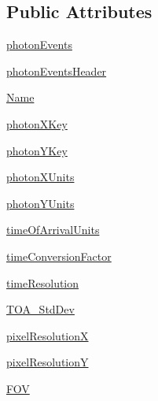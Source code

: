 \subsection*{Public Attributes}
\begin{DoxyCompactItemize}
\item 
\hyperlink{classmodest_1_1spacecraft_1_1chandra_1_1ChandraDetector_ac7c43945033c49fd9019269d724bf173}{photon\+Events}
\item 
\hyperlink{classmodest_1_1spacecraft_1_1chandra_1_1ChandraDetector_aec4bcd6338c7314387b5b7be08117d4b}{photon\+Events\+Header}
\item 
\hyperlink{classmodest_1_1spacecraft_1_1chandra_1_1ChandraDetector_aace6412cc4c3b98b8c127364f434b196}{Name}
\item 
\hyperlink{classmodest_1_1spacecraft_1_1chandra_1_1ChandraDetector_a9368465ea944d450b607cd256c9ca265}{photon\+X\+Key}
\item 
\hyperlink{classmodest_1_1spacecraft_1_1chandra_1_1ChandraDetector_af59eb340da4b61a41631801d2510246b}{photon\+Y\+Key}
\item 
\hyperlink{classmodest_1_1spacecraft_1_1chandra_1_1ChandraDetector_a95236fdcc4372f2a3af51536b1be6ece}{photon\+X\+Units}
\item 
\hyperlink{classmodest_1_1spacecraft_1_1chandra_1_1ChandraDetector_ad2929fae20dc04bef67749c4890a8dce}{photon\+Y\+Units}
\item 
\hyperlink{classmodest_1_1spacecraft_1_1chandra_1_1ChandraDetector_ab78cc698e928c6ff3ab182fc3f241990}{time\+Of\+Arrival\+Units}
\item 
\hyperlink{classmodest_1_1spacecraft_1_1chandra_1_1ChandraDetector_a5301d26739b9fd619f0d82a13ad24880}{time\+Conversion\+Factor}
\item 
\hyperlink{classmodest_1_1spacecraft_1_1chandra_1_1ChandraDetector_a1a8e3064bd35d00d792fe476a972233f}{time\+Resolution}
\item 
\hyperlink{classmodest_1_1spacecraft_1_1chandra_1_1ChandraDetector_a5bc5ab1fcbd46cd16b152aa3820de840}{T\+O\+A\+\_\+\+Std\+Dev}
\item 
\hyperlink{classmodest_1_1spacecraft_1_1chandra_1_1ChandraDetector_a04cbb28585d94cebebbbb3fea44dc366}{pixel\+ResolutionX}
\item 
\hyperlink{classmodest_1_1spacecraft_1_1chandra_1_1ChandraDetector_ae69f57c1ce54292ebeac99f6375e9e0c}{pixel\+ResolutionY}
\item 
\hyperlink{classmodest_1_1spacecraft_1_1chandra_1_1ChandraDetector_ab618f9a01fdce3840055c0dde52f1b0f}{F\+OV}

\end{DoxyCompactItemize}
